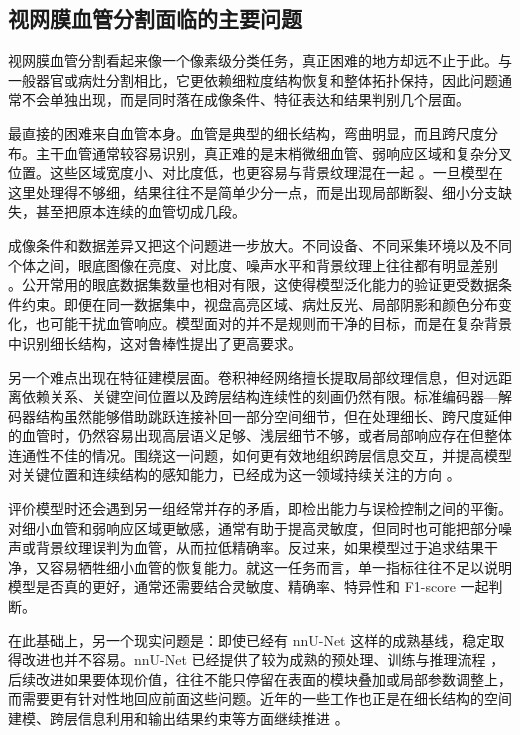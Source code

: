 \documentclass[a4paper,12pt]{article}
\begin{document}
\subsection{视网膜血管分割面临的主要问题}
视网膜血管分割看起来像一个像素级分类任务，真正困难的地方却远不止于此。与一般器官或病灶分割相比，它更依赖细粒度结构恢复和整体拓扑保持，因此问题通常不会单独出现，而是同时落在成像条件、特征表达和结果判别几个层面。

最直接的困难来自血管本身。血管是典型的细长结构，弯曲明显，而且跨尺度分布。主干血管通常较容易识别，真正难的是末梢微细血管、弱响应区域和复杂分叉位置。这些区域宽度小、对比度低，也更容易与背景纹理混在一起 \cite{staal2004drive,hoover2000locating}。一旦模型在这里处理得不够细，结果往往不是简单少分一点，而是出现局部断裂、细小分支缺失，甚至把原本连续的血管切成几段。

成像条件和数据差异又把这个问题进一步放大。不同设备、不同采集环境以及不同个体之间，眼底图像在亮度、对比度、噪声水平和背景纹理上往往都有明显差别 \cite{fraz2012ensemble,budai2013robust}。公开常用的眼底数据集数量也相对有限，这使得模型泛化能力的验证更受数据条件约束。即便在同一数据集中，视盘高亮区域、病灶反光、局部阴影和颜色分布变化，也可能干扰血管响应。模型面对的并不是规则而干净的目标，而是在复杂背景中识别细长结构，这对鲁棒性提出了更高要求。

另一个难点出现在特征建模层面。卷积神经网络擅长提取局部纹理信息，但对远距离依赖关系、关键空间位置以及跨层结构连续性的刻画仍然有限。标准编码器—解码器结构虽然能够借助跳跃连接补回一部分空间细节，但在处理细长、跨尺度延伸的血管时，仍然容易出现高层语义足够、浅层细节不够，或者局部响应存在但整体连通性不佳的情况。围绕这一问题，如何更有效地组织跨层信息交互，并提高模型对关键位置和连续结构的感知能力，已经成为这一领域持续关注的方向 \cite{zhu2021deformabledetr,zhu2019dcnv2,hou2021coordatt}。

评价模型时还会遇到另一组经常并存的矛盾，即检出能力与误检控制之间的平衡。对细小血管和弱响应区域更敏感，通常有助于提高灵敏度，但同时也可能把部分噪声或背景纹理误判为血管，从而拉低精确率。反过来，如果模型过于追求结果干净，又容易牺牲细小血管的恢复能力。就这一任务而言，单一指标往往不足以说明模型是否真的更好，通常还需要结合灵敏度、精确率、特异性和 F1-score 一起判断。

在此基础上，另一个现实问题是：即使已经有 nnU-Net 这样的成熟基线，稳定取得改进也并不容易。nnU-Net 已经提供了较为成熟的预处理、训练与推理流程 \cite{isensee2021nnunet}，后续改进如果要体现价值，往往不能只停留在表面的模块叠加或局部参数调整上，而需要更有针对性地回应前面这些问题。近年的一些工作也正是在细长结构的空间建模、跨层信息利用和输出结果约束等方面继续推进 \cite{luo2025panet,qi2023dsc,zhu2021deformabledetr,hou2021coordatt}。
\end{document}

